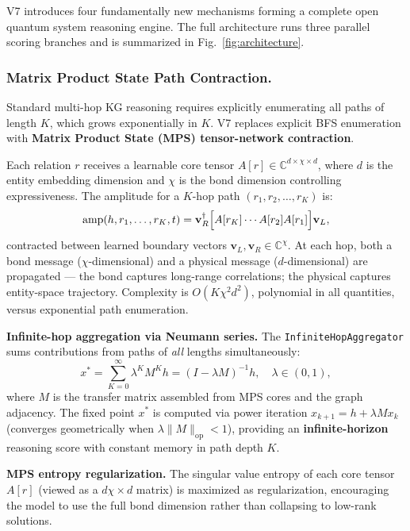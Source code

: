 \documentclass[runningheads]{llncs}
\newcommand{\CC}{\mathbb{C}}
\begin{document}
V7 introduces four fundamentally new mechanisms forming a complete open
quantum system reasoning engine.  The full architecture runs three parallel
scoring branches and is summarized in Fig.~\ref{fig:architecture}.

\subsubsection{Matrix Product State Path Contraction.}
\label{sec:mps}

Standard multi-hop KG reasoning requires explicitly enumerating all paths of
length $K$, which grows exponentially in $K$.  V7 replaces explicit BFS
enumeration with \textbf{Matrix Product State (MPS) tensor-network
contraction}.

Each relation $r$ receives a learnable core tensor
$A[r]\in\CC^{d\times\chi\times d}$, where $d$ is the entity embedding
dimension and $\chi$ is the bond dimension controlling expressiveness.
The amplitude for a $K$-hop path $(r_1,r_2,\ldots,r_K)$ is:
\begin{equation}
  \mathrm{amp}(h,r_1,\ldots,r_K,t)
  = \mathbf{v}_R^\dagger\Bigl[A[r_K]\cdots A[r_2]A[r_1]\Bigr]\mathbf{v}_L,
  \label{eq:mps}
\end{equation}
contracted between learned boundary vectors $\mathbf{v}_L,\mathbf{v}_R\in\CC^\chi$.
At each hop, both a bond message ($\chi$-dimensional) and a physical message
($d$-dimensional) are propagated --- the bond captures long-range
correlations; the physical captures entity-space trajectory.  Complexity is
$O(K\chi^2 d^2)$, polynomial in all quantities, versus exponential path
enumeration.

\textbf{Infinite-hop aggregation via Neumann series.}
The \texttt{InfiniteHopAggregator} sums contributions from paths of
\emph{all} lengths simultaneously:
\[
  x^*=\sum_{K=0}^\infty\lambda^K M^K h=(I-\lambda M)^{-1}h,\quad\lambda\in(0,1),
\]
where $M$ is the transfer matrix assembled from MPS cores and the graph
adjacency.  The fixed point $x^*$ is computed via power iteration
$x_{k+1}=h+\lambda Mx_k$ (converges geometrically when $\lambda\|M\|_\text{op}<1$),
providing an \textbf{infinite-horizon} reasoning score with constant memory
in path depth $K$.

\textbf{MPS entropy regularization.}
The singular value entropy of each core tensor $A[r]$ (viewed as a
$d\chi\times d$ matrix) is maximized as regularization, encouraging the
model to use the full bond dimension rather than collapsing to low-rank
solutions.
\end{document}
